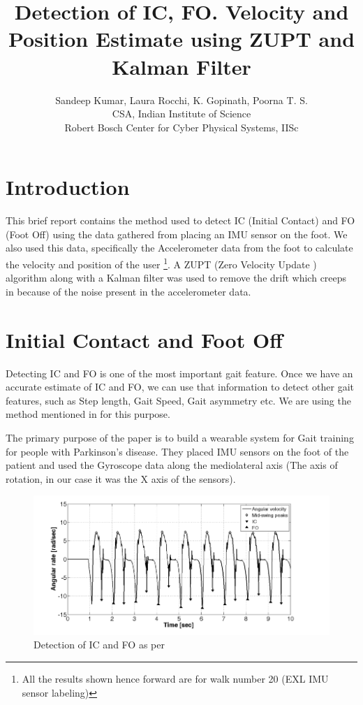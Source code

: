 \documentclass[12pt]{article}
\title{Detection of IC, FO. Velocity and Position Estimate using ZUPT and Kalman Filter}
\author{Sandeep Kumar, Laura Rocchi, K. Gopinath, Poorna T. S.\\
CSA, Indian Institute of Science\\
Robert Bosch Center for Cyber Physical Systems, IISc
}
\begin{document}
\maketitle

\section*{Introduction}
This brief report contains the method used to detect IC (Initial Contact) and FO (Foot Off) using the data gathered from placing an IMU sensor on the foot. We also used this data, specifically the Accelerometer data from the foot to calculate the velocity and  position of the user \footnote{All the results shown hence forward are for walk number 20 (EXL IMU sensor labeling)}. A ZUPT (Zero Velocity Update ) algorithm along with a Kalman filter was used to remove the drift which creeps in because of the noise present in the accelerometer data.

\section*{Initial Contact and Foot Off}
Detecting IC and FO is one of the most important gait feature. Once we have an accurate estimate of IC and FO, we can use that information to detect other gait features, such as Step length, Gait Speed, Gait asymmetry etc. We are using the method mentioned in \cite{s140406229} for this purpose.

The primary purpose of the paper \cite{s140406229} is to build a wearable system for Gait training for people with Parkinson's disease. They placed IMU sensors on the foot of the patient and used the Gyroscope data along the mediolateral axis (The axis of rotation, in our case it was the X axis of the sensors).

\begin{figure}[!htb]
\centering
\includegraphics[scale=.4]{ictodetection.png}
\caption{Detection of IC and FO as per \cite{s140406229} \\
}
\label{icnadtodetection}
\end{figure}
\end{document}
